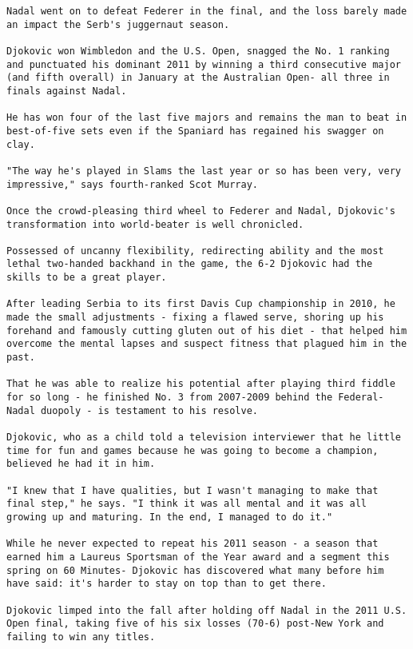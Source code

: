 \begin{lstlisting}
Nadal went on to defeat Federer in the final, and the loss barely made an impact the Serb's juggernaut season.

Djokovic won Wimbledon and the U.S. Open, snagged the No. 1 ranking and punctuated his dominant 2011 by winning a third consecutive major (and fifth overall) in January at the Australian Open- all three in finals against Nadal.

He has won four of the last five majors and remains the man to beat in best-of-five sets even if the Spaniard has regained his swagger on clay.

"The way he's played in Slams the last year or so has been very, very impressive," says fourth-ranked Scot Murray.

Once the crowd-pleasing third wheel to Federer and Nadal, Djokovic's transformation into world-beater is well chronicled.

Possessed of uncanny flexibility, redirecting ability and the most lethal two-handed backhand in the game, the 6-2 Djokovic had the skills to be a great player.

After leading Serbia to its first Davis Cup championship in 2010, he made the small adjustments - fixing a flawed serve, shoring up his forehand and famously cutting gluten out of his diet - that helped him overcome the mental lapses and suspect fitness that plagued him in the past.

That he was able to realize his potential after playing third fiddle for so long - he finished No. 3 from 2007-2009 behind the Federal-Nadal duopoly - is testament to his resolve.

Djokovic, who as a child told a television interviewer that he little time for fun and games because he was going to become a champion, believed he had it in him.

"I knew that I have qualities, but I wasn't managing to make that final step," he says. "I think it was all mental and it was all growing up and maturing. In the end, I managed to do it."

While he never expected to repeat his 2011 season - a season that earned him a Laureus Sportsman of the Year award and a segment this spring on 60 Minutes- Djokovic has discovered what many before him have said: it's harder to stay on top than to get there.

Djokovic limped into the fall after holding off Nadal in the 2011 U.S. Open final, taking five of his six losses (70-6) post-New York and failing to win any titles.


\end{lstlisting}
